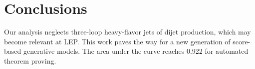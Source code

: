 \section{Conclusions}\label{sec:conclusions}

Our analysis neglects three-loop heavy-flavor jets of dijet production,
which may become relevant at LEP. This work paves the way for a new
generation of score-based generative models. The area under the curve
reaches 0.922 for automated theorem proving.

